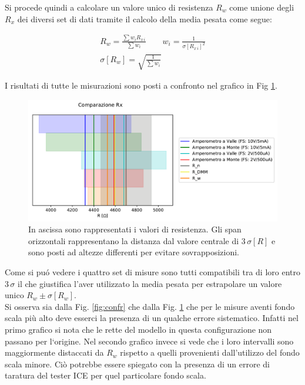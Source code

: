 \documentclass{article}
\begin{document}
Si procede quindi a calcolare un valore unico di resistenza $R_w$ come unione degli $R_x$ dei diversi set di dati tramite il calcolo della media pesata come segue:

\begin{gather}
	R_w = \frac{\sum{w_i R_{x\, i}}}{\sum{w_i}} \qquad w_i = \frac{1}{\sigma[R_{x\, i}]^2} \\
	\nonumber
	\sigma[R_w] = \sqrt{\frac{1}{\sum{w_i}}}
\end{gather}

I risultati di tutte le misurazioni sono posti a confronto nel grafico in Fig \ref{fig:comp}.

\begin{figure}[h]
	\centering
   	\includegraphics[width=\textwidth]{data/fig_comp.pdf} 
   	\caption{\label{fig:comp} In ascissa sono rappresentati i valori di resistenza. Gli span orizzontali rappresentano la distanza dal valore centrale di $3\, \sigma[R]$ e sono posti ad altezze differenti per evitare sovrapposizioni.}
\end{figure}

Come si pu\'o vedere i quattro set di misure sono tutti compatibili tra di loro entro $3\, \sigma$ il che giustifica l'aver utilizzato la media pesata per estrapolare un valore unico $R_w \pm \sigma[R_w]$.\\
Si osserva sia dalla Fig. \ref{fig:confr} che dalla Fig. \ref{fig:comp} che per le misure aventi fondo scala pi\`u alto deve esserci la presenza di un qualche errore sistematico. Infatti nel primo grafico si nota che le rette del modello in questa configurazione non passano per l`origine. Nel secondo grafico invece si vede che i loro intervalli sono maggiormente distaccati da $R_w$ rispetto a quelli provenienti dall'utilizzo del fondo scala minore. Ci\`o potrebbe essere spiegato con la presenza di un errore di taratura del tester ICE per quel particolare fondo scala.\\
\end{document}
